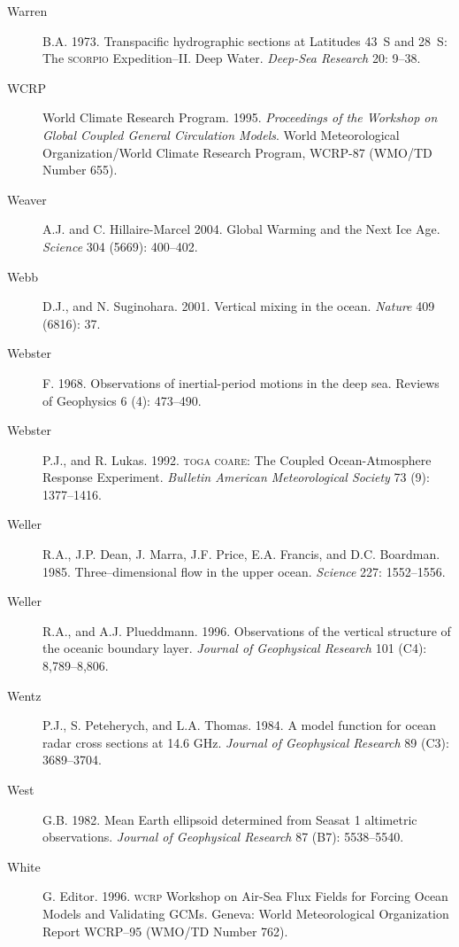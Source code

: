 \begin{description}
\item [Warren]B.A. 1973. Transpacific hydrographic sections at
  Latitudes 43\degrees\ S and 28\degrees\ S: The \textsc{scorpio}
  Expedition--II. Deep Water. \textit{Deep-Sea Research} 20: 9--38.
	
\item [WCRP]World Climate Research Program. 1995. \textit{Proceedings
  of the Workshop on Global Coupled General Circulation Models}. World
  Meteorological Organization/World Climate Research Program, WCRP-87
  (WMO/TD Number 655).

\item [Weaver]A.J. and C. Hillaire-Marcel 2004. Global Warming and the
  Next Ice Age. \textit{Science} 304 (5669): 400--402.

\item [Webb]D.J., and N. Suginohara. 2001. Vertical mixing in the
  ocean.  \textit{Nature} 409 (6816): 37.

\item [Webster]F. 1968. Observations of inertial-period motions in the
  deep sea. Reviews of Geophysics 6 (4): 473--490.

\item [Webster]P.J., and R. Lukas. 1992. \textsc{toga coare}: The
  Coupled Ocean-Atmosphere Response Experiment. \textit{Bulletin
    American Meteorological Society} 73 (9): 1377--1416.

\item [Weller]R.A., J.P. Dean, J. Marra, J.F. Price, E.A. Francis, and
  D.C.  Boardman. 1985. Three--dimensional flow in the upper
  ocean. \textit{Science} 227: 1552--1556.

\item [Weller]R.A., and A.J. Plueddmann. 1996. Observations of the
  vertical structure of the oceanic boundary layer. \textit{Journal of
    Geophysical Research} 101 (C4): 8,789--8,806.

\item [Wentz]P.J., S. Peteherych, and L.A. Thomas. 1984. A model
  function for ocean radar cross sections at 14.6 GHz. \textit{Journal
    of Geophysical Research} 89 (C3): 3689--3704.

\item [West]G.B. 1982. Mean Earth ellipsoid determined from Seasat 1
  altimetric observations. \textit{Journal of Geophysical Research} 87
  (B7): 5538--5540.

\item [White]G. Editor. 1996. \textsc{wcrp} Workshop on Air-Sea Flux
  Fields for Forcing Ocean Models and Validating GCMs. Geneva: World
  Meteorological Organization Report WCRP--95 (WMO/TD Number 762).


\end{description}
